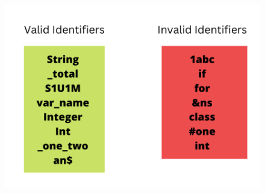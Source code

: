 \begin{flushleft}
	\bigskip
	\begin{figure}[h!]
		\centering
		\includegraphics[scale=.45]{content/chapter2/images/java.png}
	\end{figure}
	
	
\end{flushleft}


